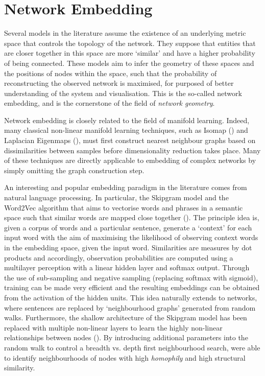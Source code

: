 \documentclass[
11pt, %
english, %
singlespacing, %
headsepline, %
]{MastersDoctoralThesis} %
\begin{document}
\section{Network Embedding}

Several models in the literature assume the existence of an underlying metric space that controls the topology of the network. They suppose that entities that are closer together in this space are more `similar' and have a higher probability of being connected. These models aim to infer the geometry of these spaces and the positions of nodes within the space, such that the probability of reconstructing the observed network is maximised, for purposed of better understanding of the system and visualisation. This is the so-called network embedding, and is the cornerstone of the field of \textit{network geometry}. 

Network embedding is closely related to the field of manifold learning. Indeed, many classical non-linear manifold learning techniques, such as Isomap (\cite{tenenbaum2000global}) and Laplacian Eigenmaps (\cite{belkin2002laplacian}), must first construct nearest neighbour graphs based on dissimilarities between samples before dimensionality reduction takes place. Many of these techniques are directly applicable to embedding of complex networks by simply omitting the graph construction step.

An interesting and popular embedding paradigm in the literature comes from natural language processing. In particular, the Skipgram model and the Word2Vec algorithm that aims to vectorise words and phrases in a semantic space such that similar words are mapped close together (\cite{mikolov2013distributed,mikolov2013efficient}). The principle idea is, given a corpus of words and a particular sentence, generate a `context' for each input word with the aim of maximising the likelihood of observing context words in the embedding space, given the input word. Similarities are measures by dot products and accordingly, observation probabilities are computed using a multilayer perception with a linear hidden layer and softmax output. Through the use of sub-sampling and negative sampling (replacing softmax with sigmoid), training can be made very efficient and the resulting embeddings can be obtained from the activation of the hidden units. This idea naturally extends to networks, where sentences are replaced by `neighbourhood graphs' generated from random walks. Furthermore, the shallow architecture of the Skipgram model has been replaced with multiple non-linear layers to learn the highly non-linear relationships between nodes (\cite{perozzi2014deepwalk,tang2015line}). By introducing additional parameters into the random walk to control a breadth vs. depth first neighbourhood search, \cite{grover2016node2vec} were able to identify neighbourhoods of nodes with high \textit{homophily} and high structural similarity. 
\end{document}
